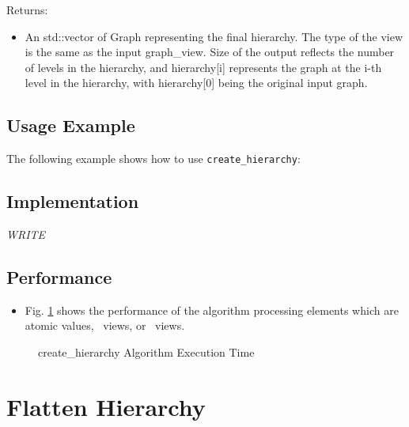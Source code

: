Returns:
\begin{itemize}
\item
An std::vector of Graph representing the final hierarchy. The type of the view is the same as the input graph\_view. Size of the output reflects the number of levels in the hierarchy, and hierarchy[i] represents the graph at the i-th level in the hierarchy, with hierarchy[0] being the original input graph. 
\end{itemize}

\subsection{Usage Example} \label{sec-create-hier-alg-use}

The following example shows how to use 
\texttt{create\_hierarchy}:


\subsection{Implementation} \label{sec-create-hier-alg-impl}

\textit{WRITE}

\subsection{Performance} \label{sec-create-hier-alg-perf}

\begin{itemize}
\item
Fig. \ref{fig:cr-hier-alg-exec-exper}
shows the performance of the algorithm processing
elements which are atomic values, \stl\ views, or \stapl\ views.
\end{itemize}

\begin{figure}[p]
\caption{ create\_hierarchy Algorithm Execution Time}
\label{fig:cr-hier-alg-exec-exper}
\end{figure}


\section{ Flatten Hierarchy}
\label{sec-flat-hier-alg}

